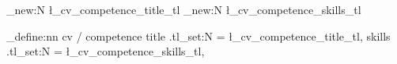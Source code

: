 \newcommand{\CVTableMetaColumnWidth}{32mm}
\newcommand{\CVEducationLabelColumnWidth}{12mm}
\newcommand{\CVEducationMainColumnWidth}{\dimexpr\textwidth-\CVEducationLabelColumnWidth-\CVTableMetaColumnWidth\relax}
\newcommand{\CVEducationTitleColumnWidth}{\dimexpr\textwidth-\CVTableMetaColumnWidth\relax}
\newcommand{\CVEducationDetailColumnWidth}{\dimexpr\textwidth-\CVEducationLabelColumnWidth\relax}

\newcommand{\CVEntryMetaWidth}{\CVTableMetaColumnWidth}
\newcommand{\CVEducationLabelWidth}{\CVEducationLabelColumnWidth}
\newcommand{\CVEducationMainWidth}{\CVEducationMainColumnWidth}
\newcommand{\CVEducationTitleWidth}{\CVEducationTitleColumnWidth}
\newcommand{\CVEducationDetailWidth}{\CVEducationDetailColumnWidth}
\newcommand{\CVEducationTableSetup}{%
  \Needspace{6\baselineskip}%
  \begingroup
  \setlength{\parskip}{0pt}%
  \setlength{\tabcolsep}{0pt}%
  \renewcommand{\arraystretch}{0.90}%
}


\newcommand{\CVSoftBreak}{\vspace{0.2em}}


\newcommand{\CVCompetenceTitleFont}{\CVTableBodyFont\bfseries}

\newcommand{\CVCompetenceSkillsFont}{\CVTableBodyFont}


\newcommand{\CVLanguageNameFont}{\CVTableBodyFont\bfseries}

\newcommand{\CVLanguageLevelFont}{\CVTableBodyFont}

\newcommand{\CVLanguageSeparator}{\enspace|\enspace}






\ExplSyntaxOn

\tl_new:N \l_cv_competence_title_tl
\tl_new:N \l_cv_competence_skills_tl

\keys_define:nn { cv / competence }
  {
    title  .tl_set:N = \l_cv_competence_title_tl,
    skills .tl_set:N = \l_cv_competence_skills_tl,
  }


